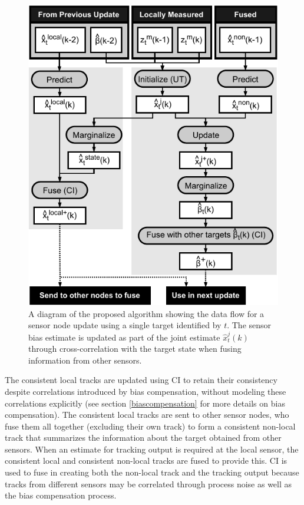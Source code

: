 \documentclass[journal]{IEEEtran}
\begin{document}
\begin{figure}[ht]
    \centering
    \includegraphics[scale=0.9]{BiasEstimationFlowchart.pdf}
    \caption{A diagram of the proposed algorithm showing the data flow for a sensor node update using a single target identified by $t$. The sensor bias estimate is updated as part of the joint estimate $\hat{x}_t^j(k)$ through cross-correlation with the target state when fusing information from other sensors.}
    \label{fig:biasestimationflowchart}
\end{figure}

The consistent local tracks are updated using CI to retain their consistency despite correlations introduced by bias compensation, without modeling these correlations explicitly (see section \ref{biascompensation} for more details on bias compensation). The consistent local tracks are sent to other sensor nodes, who fuse them all together (excluding their own track) to form a consistent non-local track that summarizes the information about the target obtained from other sensors. When an estimate for tracking output is required at the local sensor, the consistent local and consistent non-local tracks are fused to provide this. CI is used to fuse in creating both the non-local track and the tracking output because tracks from different sensors may be correlated through process noise as well as the bias compensation process.
\end{document}
